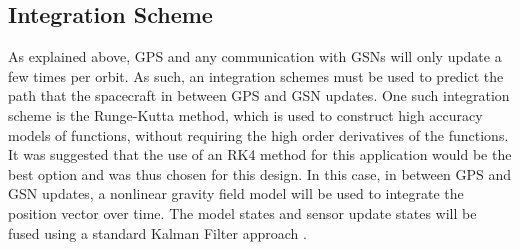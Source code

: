 \documentclass[conf]{new-aiaa}
\begin{document}
\subsection{Integration Scheme}
As explained above, GPS and any communication with GSNs will only update a few times per orbit. As such, an integration schemes must be used to predict the path that the spacecraft in between GPS and GSN updates. One such integration scheme is the Runge-Kutta method, which is used to construct high accuracy models of functions, without requiring the high order derivatives of the functions. It was suggested that the use of an RK4 method for this application would be the best option and was thus chosen for this design. In this case, in between GPS and GSN updates, a nonlinear gravity field model will be used to integrate the position vector over time. The model states and sensor update states will be fused using a standard Kalman Filter approach \cite{kalman}. 


\end{document}
